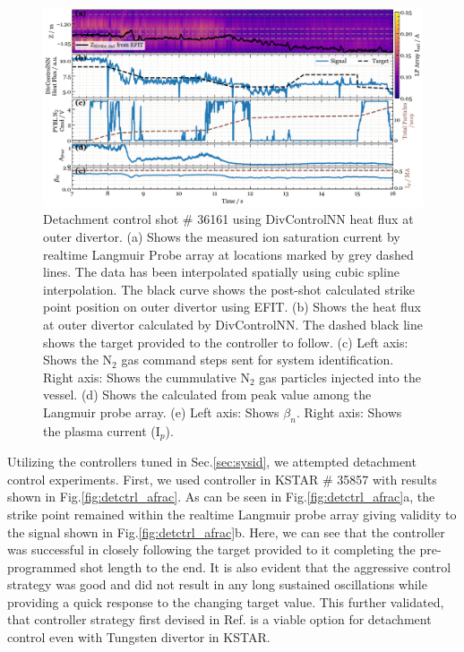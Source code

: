 \begin{figure}[!ht]
 \centering
 \includegraphics[width=\textwidth]{figures/DetCtrl_2D_36161.pdf}
 \caption{Detachment control shot \# 36161 using DivControlNN heat flux at outer divertor. (a) Shows the measured ion saturation current by realtime Langmuir Probe array at locations marked by grey dashed lines. The data has been interpolated spatially using cubic spline interpolation. The black curve shows the post-shot calculated strike point position on outer divertor using EFIT. (b) Shows the heat flux at outer divertor calculated by DivControlNN. The dashed black line shows the target provided to the controller to follow. (c) Left axis: Shows the N$_2$ gas command steps sent for system identification. Right axis: Shows the cummulative N$_2$ gas particles injected into the vessel. (d) Shows the \Afrac calculated from peak value among the Langmuir probe array. (e) Left axis: Shows $\beta_n$. Right axis: Shows the plasma current (I$_p$).}
 \label{fig:detctrl_sm}
\end{figure}

Utilizing the controllers tuned in Sec.\ref{sec:sysid}, we attempted detachment control experiments. First, we used \Afrac controller in KSTAR \# 35857 with results shown in Fig.\ref{fig:detctrl_afrac}. As can be seen in Fig.\ref{fig:detctrl_afrac}a, the strike point remained within the realtime Langmuir probe array giving validity to the \Afrac signal shown in Fig.\ref{fig:detctrl_afrac}b. Here, we can see that the controller was successful in closely following the target provided to it completing the pre-programmed shot length to the end. It is also evident that the aggressive control strategy was good and did not result in any long sustained oscillations while providing a quick response to the changing target value. This further validated, that \Afrac controller strategy first devised in Ref.\cite{Eldon_2022_PPCF} is a viable option for detachment control even with Tungsten divertor in KSTAR.

